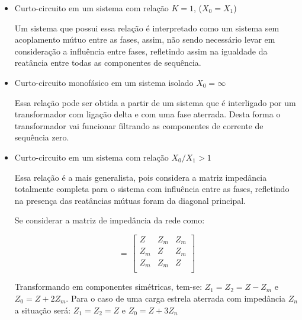 \begin{itemize}
    \item Curto-circuito em um sistema com relação $K=1$, ($X_0=X_1$)
    
    Um sistema que possui essa relação é interpretado como um sistema sem acoplamento mútuo entre as fases, assim, não sendo necessário levar em consideração a influência entre fases, refletindo assim na igualdade da reatância entre todas as componentes de sequência.
    
    \item Curto-circuito monofásico em um sistema isolado $X_0 = \infty$
    
    Essa relação pode ser obtida a partir de um sistema que é interligado por um transformador com ligação delta e com uma fase aterrada. Desta forma o transformador vai funcionar filtrando as componentes de corrente de sequência zero.
    
    \item Curto-circuito em um sistema com relação $X_0/X_1>1$
    
    Essa relação é a mais generalista, pois considera a matriz impedância totalmente completa para o sistema com influência entre as fases, refletindo na presença das reatâncias mútuas foram da diagonal principal.
    
    Se considerar a matriz de impedância da rede como:
    
    \begin{equation}
        [Z] \,=\, \begin{bmatrix} 
                      Z & Z_m & Z_m \\ 
                      Z_m & Z & Z_m  \\
                      Z_m & Z_m & Z \\  
                     \end{bmatrix}\,
    \end{equation}
    
    Transformando em componentes simétricas, tem-se: $Z_1 = Z_2 = Z - Z_m$ e $Z_0 = Z + 2Z_m$. Para o caso de uma carga estrela aterrada com impedância $Z_n$ a situação será: $Z_1 = Z_2 = Z$ e $Z_0 = Z + 3Z_n$
\end{itemize}

\newpage